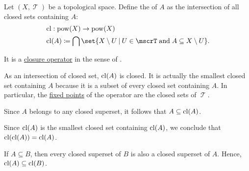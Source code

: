 \begin{definition}\label{def:topological_closure_operator}
  Let \( (X, \mscrT) \) be a topological space. Define the  of \( A \) as the intersection of all closed sets containing \( A \):
  \begin{equation*}
    \begin{aligned}
      &\cl: \pow(X) \to \pow(X) \\
      &\cl(A) \coloneqq \bigcap \set{ X \setminus U \given U \in \mscrT \T{and} A \subseteq X \setminus U }.
    \end{aligned}
  \end{equation*}

  It is a \hyperref[def:closure_operator]{closure operator} in the sense of .
\end{definition}
\begin{comments}
  \item As an intersection of closed set, \( \operatorname{cl}(A) \) is closed. It is actually the smallest closed set containing \( A \) because it is a subset of every closed set containing \( A \). In particular, the \hyperref[def:fixed_point]{fixed points} of the operator are the closed sets of \( \mscrT \).
\end{comments}
\begin{defproof}
   Since \( A \) belongs to any closed superset, it follows that \( A \subseteq \operatorname{cl}(A) \).

   Since \( \operatorname{cl}(A) \) is the smallest closed set containing \( \operatorname{cl}(A) \), we conclude that \( \operatorname{cl}(\operatorname{cl}(A)) = \operatorname{cl}(A) \).

   If \( A \subseteq B \), then every closed superset of \( B \) is also a closed superset of \( A \). Hence, \( \operatorname{cl}(A) \subseteq \operatorname{cl}(B) \).
\end{defproof}

